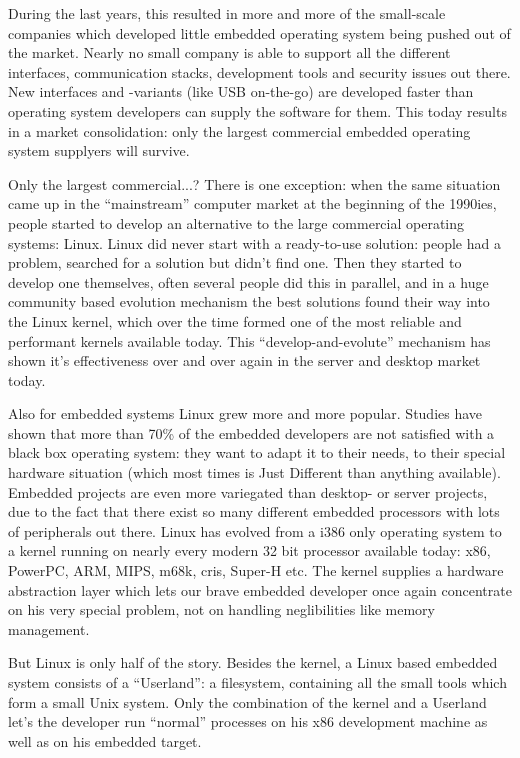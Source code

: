 During the last years, this resulted in more and more of the small-scale
companies which developed little embedded operating system being pushed
out of the market. Nearly no small company is able to support all the
different interfaces, communication stacks, development tools and
security issues out there. New interfaces and -variants (like USB
on-the-go) are developed faster than operating system developers can
supply the software for them. This today results in a market
consolidation: only the largest commercial embedded operating system
supplyers will survive. 

Only the largest commercial...? There is one exception: when the same
situation came up in the "`mainstream"' computer market at the beginning
of the 1990ies, people started to develop an alternative to the large
commercial operating systems: Linux. Linux did never start with a
ready-to-use solution: people had a problem, searched for a solution but
didn't find one. Then they started to develop one themselves, often
several people did this in parallel, and in a huge community based
evolution mechanism the best solutions found their way into the Linux
kernel, which over the time formed one of the most reliable and
performant kernels available today. This "`develop-and-evolute"'
mechanism has shown it's effectiveness over and over again in the
server and desktop market today. 

Also for embedded systems Linux grew more and more popular. Studies have
shown that more than 70\% of the embedded developers are not satisfied
with a black box operating system: they want to adapt it to their needs,
to their special hardware situation (which most times is Just Different
than anything available). Embedded projects are even more variegated
than desktop- or server projects, due to the fact that there exist so
many different embedded processors with lots of peripherals out there.
Linux has evolved from a i386 only operating system to a kernel running
on nearly every modern 32 bit processor available today: x86, PowerPC,
ARM, MIPS, m68k, cris, Super-H etc. The kernel supplies a hardware
abstraction layer which lets our brave embedded developer once again
concentrate on his very special problem, not on handling neglibilities
like memory management. 

But Linux is only half of the story. Besides the kernel, a Linux based
embedded system consists of a "`Userland"': a filesystem, containing all
the small tools which form a small Unix system. Only the combination of
the kernel and a Userland let's the developer run "`normal"' processes
on his x86 development machine as well as on his embedded target. 

